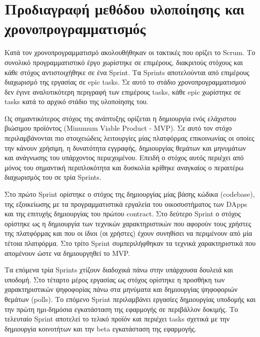 \section[Προδιαγραφή μεθόδου υλοποίησης και χρονοπρογραμματισμός]{Προδιαγραφή μεθόδου υλοποίησης και χρονοπρογραμματισμός%
  } 

\label{section:3-8-implementation-methodology-specification}

Κατά τον χρονοπρογραμματισμό ακολουθήθηκαν οι τακτικές που ορίζει το Scrum. Το συνολικό προγραμματιστικό έργο χωρίστηκε σε επιμέρους, διακριτούς στόχους και κάθε στόχος αντιστοιχήθηκε σε ένα Sprint. Τα Sprints αποτελούνται από επιμέρους διαχωρισμό της εργασίας σε epic tasks. Σε αυτό το στάδιο χρονοπρογραμματισμού δεν έγινε αναλυτικότερη περιγραφή των επιμέρους tasks, κάθε epic χωρίστηκε σε tasks κατά το αρχικό στάδιο της υλοποίησης του.

Ως σημαντικότερος στόχος της ανάπτυξης ορίζεται η δημιουργία ενός ελάχιστου βιώσιμου προϊόντος (Minumum Viable Product - MVP). Σε αυτό τον στόχο περιλαμβάνονται πιο στοιχειώδεις λειτουργίες μίας πλατφόρμας επικοινωνίας οι οποίες την κάνουν χρήσιμη, η δυνατότητα εγγραφής, δημιουργίας θεμάτων και μηνυμάτων και ανάγνωσης του υπάρχοντος περιεχομένου. Επειδή ο στόχος αυτός περιέχει από μόνος του σημαντική περιπλοκότητα και δυσκολία κρίθηκε αναγκαίος ο περαιτέρω διαχωρισμός του σε τρία Sprints.

Στο πρώτο Sprint ορίστηκε ο στόχος της δημιουργίας μίας βάσης κώδικα (codebase), της εξοικείωσης με τα προγραμματιστικά εργαλεία του οικοσυστήματος των DApps και της επιτυχής δημιουργίας του πρώτου contract. Στο δεύτερο Sprint ο στόχος ορίστηκε ως η δημιουργία των τεχνικών χαρακτηριστικών που αφορούν τους χρήστες της πλατφόρμας και που οι ίδιοι (οι χρήστες) έχουν συνηθίσει να περιμένουν από μία τέτοια πλατφόρμα. Στο τρίτο Sprint συμπεριλήφθηκαν τα τεχνικά χαρακτηριστικά που απομένουν ώστε να δημιουργηθεί το MVP.

Τα επόμενα τρία Sprints χτίζουν διαδοχικά πάνω στην υπάρχουσα δουλειά και υποδομή. Στο τέταρτο μέρος εργασίας ως στόχος ορίστηκε η προσθήκη των χαρακτηριστικών ψηφοφορίας πάνω στα μηνύματα και δημιουργίας ψηφοφοριών θεμάτων (polls). Το επόμενο Sprint περιλαμβάνει εργασίες δημιουργίας υποδομής και την πρώτη ημι-δημόσια εγκατάσταση της εφαρμογής σε περιβάλλον δοκιμής. Το τελευταίο Sprint αποτελεί το τελικό προϊόν και περιέχει tasks σχετικά με την δημιουργία κοινοτήτων και την beta εγκατάσταση της εφαρμογής.

